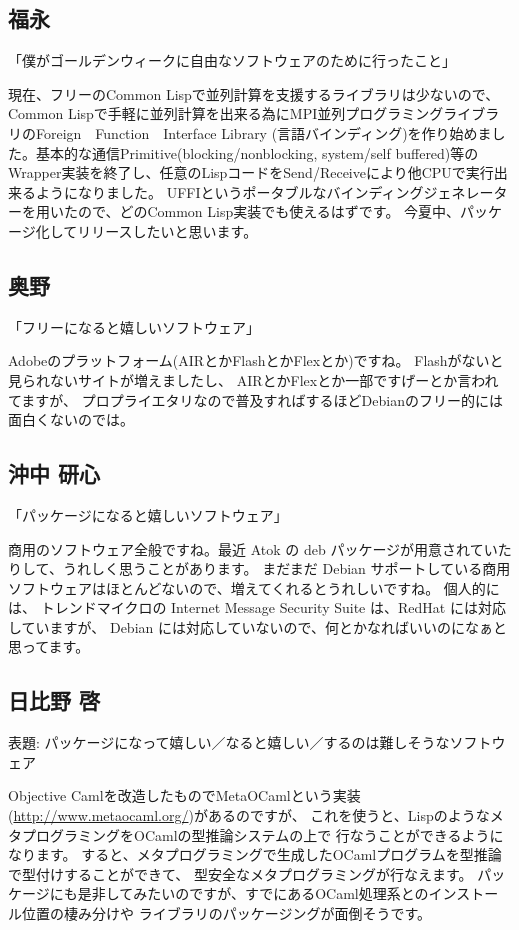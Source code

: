 \documentclass[mingoth,a4paper]{jsarticle}
\begin{document}
\begin{multicols}{2}
\subsection{福永}

「僕がゴールデンウィークに自由なソフトウェアのために行ったこと」

現在、フリーのCommon Lispで並列計算を支援するライブラリは少ないので、
Common Lispで手軽に並列計算を出来る為にMPI並列プログラミングライブラリのForeign　Function　Interface
Library (言語バインディング)を作り始めました。基本的な通信Primitive(blocking/nonblocking,
system/self buffered)等のWrapper実装を終了し、任意のLispコードをSend/Receiveにより他CPUで実行出来るようになりました。
UFFIというポータブルなバインディングジェネレーターを用いたので、どのCommon Lisp実装でも使えるはずです。
今夏中、パッケージ化してリリースしたいと思います。

\subsection{奥野}

「フリーになると嬉しいソフトウェア」

Adobeのプラットフォーム(AIRとかFlashとかFlexとか)ですね。
Flashがないと見られないサイトが増えましたし、
AIRとかFlexとか一部ですげーとか言われてますが、
プロプライエタリなので普及すればするほどDebianのフリー的には面白くないのでは。

\subsection{沖中 研心}

「パッケージになると嬉しいソフトウェア」

商用のソフトウェア全般ですね。最近 Atok の deb パッケージが用意されていたりして、うれしく思うことがあります。
まだまだ Debian サポートしている商用ソフトウェアはほとんどないので、増えてくれるとうれしいですね。
個人的には、 トレンドマイクロの Internet Message Security Suite は、RedHat には対応していますが、
Debian には対応していないので、何とかなればいいのになぁと思ってます。

\subsection{日比野 啓}

表題: パッケージになって嬉しい／なると嬉しい／するのは難しそうなソフトウェア

Objective Camlを改造したものでMetaOCamlという実装(\url{http://www.metaocaml.org/})があるのですが、
これを使うと、LispのようなメタプログラミングをOCamlの型推論システムの上で
行なうことができるようになります。
すると、メタプログラミングで生成したOCamlプログラムを型推論で型付けすることができて、
型安全なメタプログラミングが行なえます。
パッケージにも是非してみたいのですが、すでにあるOCaml処理系とのインストール位置の棲み分けや
ライブラリのパッケージングが面倒そうです。


\end{multicols}
\end{document}
